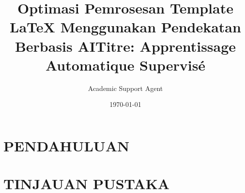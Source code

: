 \documentclass{beamer}
\title{Optimasi Pemrosesan Template LaTeX Menggunakan Pendekatan Berbasis AI}
\author{Academic Support Agent}
\date{\today}
\begin{document}
\maketitle

\begin{abstract}

\end{abstract}

\chapter{PENDAHULUAN}


\chapter{TINJAUAN PUSTAKA}


  
\usepackage[utf8]{inputenc}
\usepackage[english]{babel}
\usepackage[T1]{fontenc}
\usepackage{helvet}
\newcommand{\chref}[2]{%
  \href{#1}{{\usebeamercolor[bg]{Namkeen}#2}}%
}

\title[Apprentissage Automatique Supervisé]%
{Titre: Apprentissage Automatique Supervisé}
\end{document}
